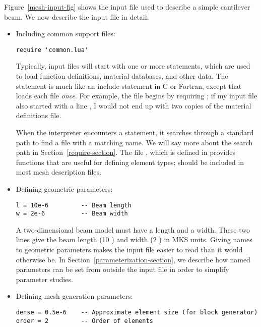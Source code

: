 Figure~\ref{mesh-input-fig} shows the input file used to describe a
simple cantilever beam.  We now describe the input file in detail.  

\begin{itemize}

\item Including common support files:
\begin{verbatim}
require 'common.lua'
\end{verbatim}

Typically, input files will start with one or more 
statements, which are used to load function definitions, material
databases, and other data.  The  statement is much
like an include statement in C or Fortran, except that
 loads each file \emph{once}.  For example, the file
 begins by requiring ; if my
input file also started with a line ,
I would not end up with two copies of the material definitions file.

When the interpreter encounters a  statement, it
searches through a standard path to find a file with a matching name.
We will say more about the search path in
Section~\ref{require-section}.  The file , which is
defined in  provides functions that are
useful for defining element types;  should be
included in most mesh description files.

\item Defining geometric parameters:
\begin{verbatim}
l = 10e-6         -- Beam length
w = 2e-6          -- Beam width
\end{verbatim}

A two-dimensional beam model must have a length and a width.  These
two lines give the beam length (10 \mum) and width (2 \mum) in MKS
units.  Giving names to geometric parameters makes the input file
easier to read than it would otherwise be.  In
Section~\ref{parameterization-section}, we describe how named
parameters can be set from outside the input file in order to simplify
parameter studies.

\item Defining mesh generation parameters:
\begin{verbatim}
dense = 0.5e-6    -- Approximate element size (for block generator)
order = 2         -- Order of elements
\end{verbatim}


\end{itemize}
